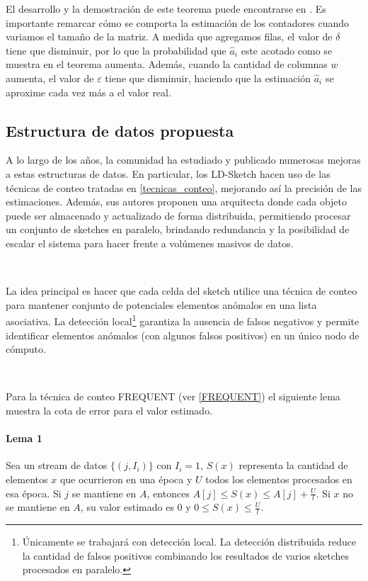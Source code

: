 \documentclass[a4paper,12pt, oneside]{article}
\begin{document}
El desarrollo y la demostración de este teorema puede encontrarse en \cite{Cormode:2005:IDS:1073713.1073718}. Es importante remarcar cómo se comporta la estimación de los contadores cuando variamos el tamaño de la matriz. A medida que agregamos filas, el valor de $\delta$ tiene que disminuir, por lo que la probabilidad que $\hat{a}_i$ este acotado como se muestra en el teorema aumenta. Además, cuando la cantidad de columnas $w$ aumenta, el valor de $\varepsilon$ tiene que disminuir, haciendo que la estimación $\hat{a}_i$ se aproxime cada vez más a el valor real.

\subsection{Estructura de datos propuesta}
A lo largo de los años, la comunidad ha estudiado y publicado numerosas mejoras a estas estructuras de datos. En particular, los LD-Sketch \cite{Huang:2015:HLD:2839515.2839568} hacen uso de las técnicas de conteo tratadas en \ref{tecnicas_conteo}, mejorando así la precisión de las estimaciones. Además, sus autores proponen una arquitecta donde cada objeto puede ser almacenado y actualizado de forma distribuida, permitiendo procesar un conjunto de sketches en paralelo, brindando redundancia y la posibilidad de escalar el sistema para hacer frente a volúmenes masivos de datos.

\

La idea principal es hacer que cada celda del sketch utilice una técnica de conteo para mantener conjunto de potenciales elementos anómalos en una lista asociativa. La detección local\footnote{Únicamente se trabajará con detección local. La detección distribuida reduce la cantidad de falsos positivos combinando los resultados de varios sketches procesados en paralelo.} garantiza la ausencia de falsos negativos y permite identificar elementos anómalos (con algunos falsos positivos) en un único nodo de cómputo.

\

Para la técnica de conteo FREQUENT (ver \ref{FREQUENT}) el siguiente lema muestra la cota de error para el valor estimado\cite{Misra1982143}.

\paragraph{Lema 1} Sea un stream de datos $\{(j, I_i)\}$ con $I_i=1$, $S(x)$ representa la cantidad de elementos $x$ que ocurrieron en una época y $U$ todos los elementos procesados en esa época. Si $j$ se mantiene en $A$, entonces $A[j] \leq S(x) \leq A[j] + \frac{U}{l}$. Si $x$ no se mantiene en $A$, su valor estimado es $0$ y $0 \leq S(x) \leq \frac{U}{l}$.
\end{document}
